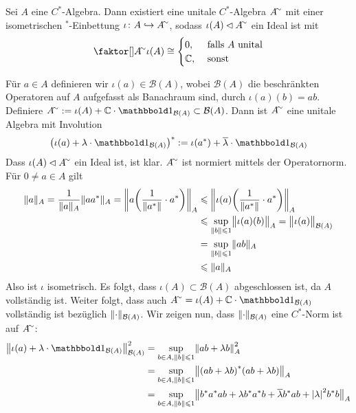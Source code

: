 \begin{satz}[label=satz:26,{name=[Unitalisierung]}]
	Sei $A$ eine $C^*$-Algebra. Dann existiert eine unitale $C^*$-Algebra $A^\simm$ mit einer isometrischen ${}^*$-Einbettung $\iota \colon A \hookrightarrow A^\simm$, sodass
	$\iota(A) \lhd A^\simm$ ein Ideal ist mit 
	\[
		\Faktor{A^\simm}{\iota(A)} \cong \begin{cases}
			0, &\text{ falls }A \text{ unital} \\
			\mathbb{C} , &\text{ sonst }  
		\end{cases}
	\]
\end{satz}
\begin{beweis}
	Für $a \in A$ definieren wir $\iota(a) \in \mathcal{B}(A)$, wobei $\mathcal{B}(A)$ die beschränkten Operatoren auf $A$ aufgefasst als Banachraum sind, durch
	$\iota(a)(b)=ab$. Definiere $A^\simm := \iota(A) + \mathbb{C} \cdot \ind_{\mathcal{B}(A)} \subset \mathcal{B}(A)$. Dann ist $A^\simm$ eine unitale Algebra mit Involution
	\[
		\enbrace*{\iota(a)+\lambda \cdot \ind_{\mathcal{B}(A)}}^* := \iota(a^*) + \overline{\lambda} \cdot \ind_{\mathcal{B}(A)}
	\]
	Dass $\iota(A) \lhd A^\simm$ ein Ideal ist, ist klar. $A^\simm$ ist normiert mittels der Operatornorm. Für $0 \neq a \in A$ gilt  
	\begin{align}
		\norm{a}_A = \frac{1}{\norm{a}_A}\norm{aa^*}_A = \norm*{a \enbrace*{\frac{1}{\norm{a^*} } \cdot a^*}}_A &\le \norm*{\iota(a) \enbrace*{\frac{1}{\norm{a^*}}\cdot a^* }}_A \\
		&\le \sup_{\norm{b} \le 1} \norm[\big]{\iota(a)(b)}_A = \norm[\big]{\iota(a)}_{\mathcal{B}(A)} \\
		&= \sup_{\norm{b} \le 1} \norm{ab}_A \\
		&\le \norm{a}_A   
	\end{align}
	Also ist $\iota$ isometrisch. Es folgt, dass $\iota(A) \subset \mathcal{B}(A)$ abgeschlossen ist, da $A$ vollständig ist. Weiter folgt, dass auch 
	$A^\simm = \iota(A) + \mathbb{C} \cdot \ind_{\mathcal{B}(A)}$ vollständig ist bezüglich $\norm{\cdot}_{\mathcal{B}(A)}$. Wir zeigen nun, dass $\norm{\cdot}_{\mathcal{B}(A)}$ 
	eine $C^*$-Norm ist auf $A^\simm$: 
	\begin{align}
		\norm*{\iota(a)+ \lambda \cdot \ind_{\mathcal{B}(A)}}_{\mathcal{B}(A)}^2 &= \sup_{b \in A, \norm{b} \le 1 } \norm*{ab + \lambda b}^2_A \\
		&= \sup_{b \in A, \norm{b} \le 1} \norm[\big]{\enbrace*{ab+\lambda b}^* (ab +\lambda b)}_A \\
		&= \sup_{b \in A, \norm{b} \le 1} \norm[\big]{b^* a^* ab + \lambda b^* a^* b + \overline{\lambda} b^* ab + \abs*{\lambda}^2 b^* b}_{A} \\

\end{align}
\end{beweis}
